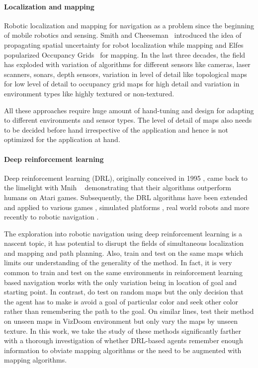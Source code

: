 \paragraph{Localization and mapping}
Robotic localization and mapping for navigation as a problem since the beginning of mobile robotics and sensing.
Smith and Cheeseman~\cite{SmChIJRR1986} introduced the idea of propagating spatial uncertainty for robot localization while mapping and Elfes popularized Occupancy Grids~\cite{ElCOMPUTER1980} for mapping.
In the last three decades, the field has exploded with variation of algorithms for different sensors like cameras, laser scanners, sonars, depth sensors, variation in level of detail like topological maps \cite{KuCOGSCI1978} for low level of detail to occupancy grid maps for high detail and variation in environment types like highly textured or non-textured.

All these approaches require huge amount of hand-tuning and design for adapting to different environments and sensor types. The level of detail of maps also needs to be decided before hand irrespective of the application and hence is not optimized for the application at hand.

\paragraph{Deep reinforcement learning}
Deep reinforcement learning (DRL), originally conceived in 1995 \cite{TeACM1995}, came back to the limelight with Mnih \etal~ \cite{MnKaSiNATURE2015,MnKaSiNIPSDLW2013} demonstrating that their algorithms outperform humans on Atari games. Subsequently, the DRL algorithms have been extended \cite{MnBaMiICML2016} and applied to various games \cite{SiHuMaNATURE2016}, simulated platforms \cite{KaStJoNIPS2017}, real world robots \cite{LePaKrISER2017} and more recently to robotic navigation \cite{MiPaViICLR2017,OhChSiICML2016}.

The exploration into robotic navigation using deep reinforcement learning is a nascent topic, it has potential to disrupt the fields of simultaneous localization and mapping and path planning. Also, \cite{MiPaViICLR2017} train and test on the same maps which limits our understanding of the generality of the method. In fact, it is very common to train and test on the same environments in reinforcement learning based navigation works \cite{ZhMoKoICRA2017,KuSaGaAPA2016} with the only variation being in location of goal and starting point. In contrast, \cite{OhChSiICML2016} do test on random maps but the only decision that the agent has to make is avoid a goal of particular color and seek other color rather than remembering the path to the goal. On similar lines, \cite{ChLaSaNIPS2016} test their method on unseen maps in VizDoom environment but only vary the maps by unseen texture.
%
In this work, we take the study of these methods significantly farther with a thorough investigation of whether DRL-based agents remember enough information to obviate mapping algorithms or the need to be augmented with mapping algorithms.
